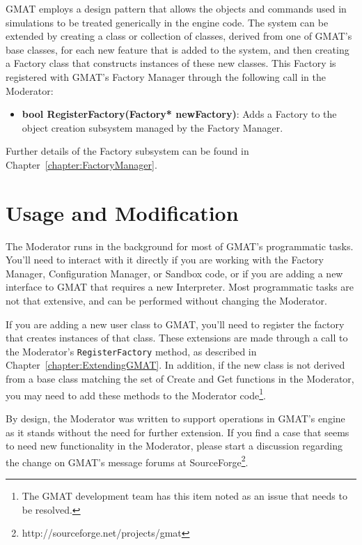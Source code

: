 GMAT employs a design pattern that allows the objects and commands used in simulations to be
treated generically in the engine code.  The system can be extended by creating a class or
collection of classes, derived from one of GMAT's base classes, for each new feature that is added
to the system, and then creating a Factory class that constructs instances of these new classes. 
This Factory is registered with GMAT's Factory Manager through the following call in the Moderator: 

\begin{itemize}
\item \textbf{bool RegisterFactory(Factory* newFactory)}:  Adds a Factory to the object creation
subsystem managed by the Factory Manager.
\end{itemize}

\noindent  Further details of the Factory subsystem can be found in
Chapter~\ref{chapter:FactoryManager}.

\section{Usage and Modification}

The Moderator runs in the background for most of GMAT's programmatic tasks.  You'll need to
interact with it directly if you are working with the Factory Manager, Configuration Manager, or
Sandbox code, or if you are adding a new interface to GMAT that requires a new Interpreter.  Most
programmatic tasks are not that extensive, and can be performed without changing the Moderator.

If you are adding a new user class to GMAT, you'll need to register the factory that creates
instances of that class.  These extensions are made through a call to the Moderator's
\texttt{RegisterFactory} method, as described in Chapter~\ref{chapter:ExtendingGMAT}.  In addition,
if the new class is not derived from a base class matching the set of Create and Get functions in
the Moderator, you may need to add these methods to the Moderator code\footnote{The GMAT
development team has this item noted as an issue that needs to be resolved.}.

By design, the Moderator was written to support operations in GMAT's engine as it stands without
the need for further extension.  If you find a case that seems to need new functionality in the
Moderator, please start a discussion regarding the change on GMAT's message forums at
SourceForge\footnote{http://sourceforge.net/projects/gmat}.
